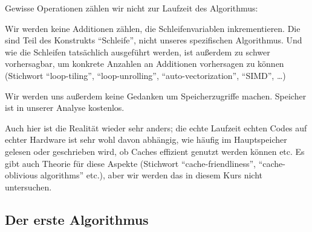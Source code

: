 \begin{remark}
    Gewisse Operationen zählen wir nicht zur Laufzeit des Algorithmus:

    \smallskip
    Wir werden keine Additionen zählen, die Schleifenvariablen inkrementieren. Die sind Teil des Konstrukts \enquote{Schleife}, nicht unseres spezifischen Algorithmus. Und wie die Schleifen tatsächlich ausgeführt werden, ist außerdem zu schwer vorhersagbar, um konkrete Anzahlen an Additionen vorhersagen zu können (Stichwort \enquote{loop-tiling}, \enquote{loop-unrolling}, \enquote{auto-vectorization}, \enquote{SIMD}, \ldots)

    \medskip
    Wir werden uns außerdem keine Gedanken um Speicherzugriffe machen. Speicher ist in unserer Analyse kostenlos.

    Auch hier ist die Realität wieder sehr anders; die echte Laufzeit echten Codes auf echter Hardware ist sehr wohl davon abhängig, wie häufig im Hauptspeicher gelesen oder geschrieben wird, ob Caches effizient genutzt werden können etc. Es gibt auch Theorie für diese Aspekte (Stichwort \enquote{cache-friendliness}, \enquote{cache-oblivious algorithms} etc.), aber wir werden das in diesem Kurs nicht untersuchen.
\end{remark}

\subsection{Der erste Algorithmus}\label{slow_multiplication:first_algorithm}

